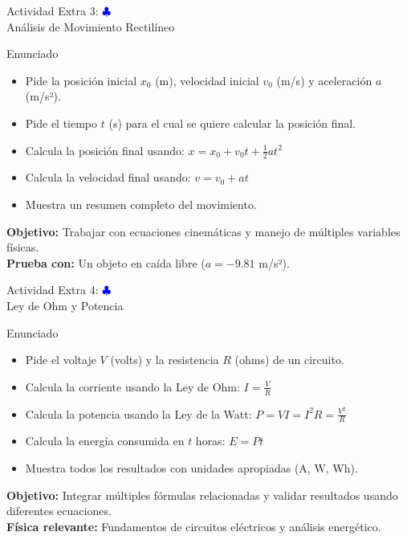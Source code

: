 \documentclass[10pt]{beamer}
\begin{document}
\begin{frame}{Actividad Extra 3: \hfill \textcolor{blue}{$\clubsuit$} \\ Análisis de Movimiento Rectilíneo}
  \begin{block}{Enunciado}
    \begin{itemize}
      \item Pide la posición inicial \(x_0\) (m), velocidad inicial \(v_0\) (m/s) y aceleración \(a\) (m/s²).
      \item Pide el tiempo \(t\) (s) para el cual se quiere calcular la posición final.
      \item Calcula la posición final usando: \(x = x_0 + v_0 t + \frac{1}{2}at^2\)
      \item Calcula la velocidad final usando: \(v = v_0 + at\)
      \item Muestra un resumen completo del movimiento.
    \end{itemize}
  \end{block}
  
  \textbf{Objetivo:} Trabajar con ecuaciones cinemáticas y manejo de múltiples variables físicas.
  \\
  \textbf{Prueba con:} Un objeto en caída libre (\(a = -9.81\) m/s²).
\end{frame}

\begin{frame}{Actividad Extra 4: \hfill \textcolor{blue}{$\clubsuit$} \\ Ley de Ohm y Potencia}
  \begin{block}{Enunciado}
    \begin{itemize}
      \item Pide el voltaje \(V\) (volts) y la resistencia \(R\) (ohms) de un circuito.
      \item Calcula la corriente usando la Ley de Ohm: \(I = \frac{V}{R}\)
      \item Calcula la potencia usando la Ley de la Watt: \(P = VI = I^2R = \frac{V^2}{R}\)
      \item Calcula la energía consumida en \(t\) horas: \(E = Pt\)
      \item Muestra todos los resultados con unidades apropiadas (A, W, Wh).
    \end{itemize}
  \end{block}
  
  \textbf{Objetivo:} Integrar múltiples fórmulas relacionadas y validar resultados usando diferentes ecuaciones.
  \\
  \textbf{Física relevante:} Fundamentos de circuitos eléctricos y análisis energético.
\end{frame}
\end{document}

